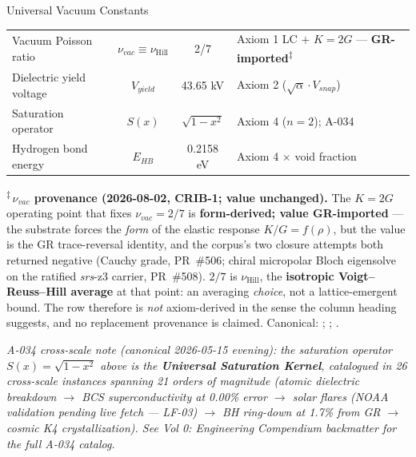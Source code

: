 \begin{designbox}{Universal Vacuum Constants}
\begin{center}
{\begin{tabular}{l c c l}
Vacuum Poisson ratio & $\nu_{vac} \equiv \nu_{\text{Hill}}$ & 2/7 & Axiom 1 LC $+$ $K{=}2G$ --- \textbf{GR-imported}\textsuperscript{$\ddagger$} \\
Dielectric yield voltage & $V_{yield}$ & 43.65 kV & Axiom 2 ($\sqrt{\alpha} \cdot V_{snap}$) \\
Saturation operator & $S(x)$ & $\sqrt{1-x^2}$ & Axiom 4 ($n = 2$); A-034 \\
Hydrogen bond energy & $E_{HB}$ & 0.2158 eV & Axiom 4 $\times$ void fraction \\
\hline\hline
\end{tabular}%
}
\end{center}
\end{designbox}

\noindent\footnotesize\textsuperscript{$\ddagger$}\,\textbf{$\nu_{vac}$ provenance (2026-08-02, CRIB-1; value unchanged).} The $K = 2G$ operating point that fixes $\nu_{vac} = 2/7$ is \textbf{form-derived; value GR-imported} --- the substrate forces the \emph{form} of the elastic response $K/G = f(\rho)$, but the value is the GR trace-reversal identity, and the corpus's two closure attempts both returned negative (Cauchy grade, PR~\#506; chiral micropolar Bloch eigensolve on the ratified \emph{srs}-z3 carrier, PR~\#508). $2/7$ is $\nu_{\text{Hill}}$, the \textbf{isotropic Voigt--Reuss--Hill average} at that point: an averaging \emph{choice}, not a lattice-emergent bound. The row therefore is \emph{not} axiom-derived in the sense the column heading suggests, and no replacement provenance is claimed. Canonical: ; ; .\normalsize

\noindent \textit{A-034 cross-scale note (canonical 2026-05-15 evening): the saturation operator $S(x) = \sqrt{1-x^2}$ above is the \textbf{Universal Saturation Kernel}, catalogued in 26 cross-scale instances spanning 21 orders of magnitude (atomic dielectric breakdown $\to$ BCS superconductivity at 0.00\% error $\to$ solar flares (NOAA validation pending live fetch --- LF-03) $\to$ BH ring-down at 1.7\% from GR $\to$ cosmic K4 crystallization). See Vol 0: Engineering Compendium backmatter for the full A-034 catalog.} %

